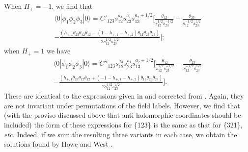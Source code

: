 \documentclass[a4paper,12pt]{article}
\def\thetabar    {\bar{\theta}}
\begin{document}
When $H_+=-1$, we find that
\begin{multline}
\label{3pto1}
\langle 0 | \phi_1 \phi_2 \phi_3 | 0 \rangle = C'_{123} 
s_{12}^{a_3} s_{23}^{a_1} s_{13}^{a_2+1/2} \bigg[
  \frac{\theta_{12}}{s_{12}^{1/2}s_{23}^{-1/2}}  -
\frac{\theta_{23}}{s_{12}^{-1/2}s_{23}^{1/2}}\\
 - \frac{(h_{+,1} \theta_{23}
\theta_{12} \thetabar_{12} + (1-h_{+,1}-h_{+,2}) \theta_{12} \theta_{23}
\thetabar_{23})}{2s_{12}^{1/2}s_{23}^{1/2}} \bigg];
\end{multline}
when $H_+=1$ we have
\begin{multline}
\label{3pto2}
\langle 0 | \phi_1 \phi_2 \phi_3 | 0 \rangle = C''_{123} 
s_{12}^{a_3} s_{23}^{a_1} s_{13}^{a_2+1/2} \bigg[
  \frac{\thetabar_{12}}{s_{12}^{1/2}s_{23}^{-1/2}}  -
\frac{\thetabar_{23}}{s_{12}^{-1/2}s_{23}^{1/2}}\\
 - \frac{(h_{+,1} \thetabar_{23}
\theta_{12} \thetabar_{12} + (-1-h_{+,1}-h_{+,2}) \thetabar_{12} \theta_{23}
\thetabar_{23})}{2s_{12}^{1/2}s_{23}^{1/2}} \bigg].
\end{multline}
These are identical to the expressions given in \cite{Bl} and corrected from
\cite{MSS}.  Again, they are not invariant under permutations of the
field labels.  However, we find that (with the proviso discussed
above that anti-holomorphic coordinates should be included) the form
of these expressions for \{123\} is the same as that for \{321\}, {\em etc.}
 Indeed, if we sum the resulting three variants in each case, we obtain the
 solutions found by Howe and West \cite{West}.
\end{document}
